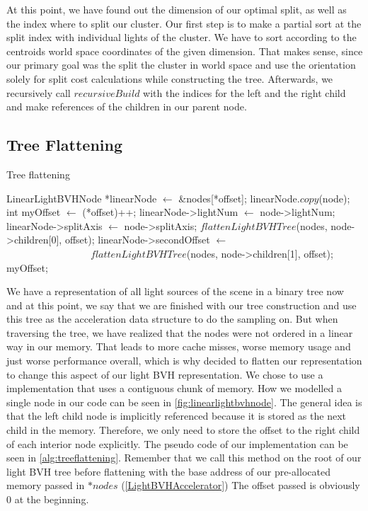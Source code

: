 At this point, we have found out the dimension of our optimal split, as well as the index where to split our cluster. Our first step is to make a partial sort at the split index with individual lights of the cluster. We have to sort according to the centroids world space coordinates of the given dimension. That makes sense, since our primary goal was the split the cluster in world space and use the orientation solely for split cost calculations while constructing the tree. Afterwards, we recursively call $recursiveBuild$ with the indices for the left and the right child and make references of the children in our parent node.

\subsection{Tree Flattening}
\label{subs:flat}

\begin{algorithm}
	\caption{Tree flattening}
	\label{alg:treeflattening}
	\begin{algorithmic}[1] %
		\State LinearLightBVHNode *linearNode $\gets$ \&nodes[*offset];
		\State linearNode.$copy$(node);
		\State int myOffset $\gets$ (*offset)++;
		\State linearNode->lightNum $\gets$ node->lightNum;
		\Else
		\State linearNode->splitAxis $\gets$ node->splitAxis;
		\State $flattenLightBVHTree$(nodes, node->children[0], offset);
		\State linearNode->secondOffset $\gets$ \\ \ \ \ \ \ \ \ \ \ \ \ \ \ \ \ \ \ $flattenLightBVHTree$(nodes, node->children[1], offset);
		\EndIf
		\State \Return myOffset;
		\EndProcedure
	\end{algorithmic}
\end{algorithm}

We have a representation of all light sources of the scene in a binary tree now and at this point, we say that we are finished with our tree construction and use this tree as the acceleration data structure to do the sampling on. But when traversing the tree, we have realized that the nodes were not ordered in a linear way in our memory. That leads to more cache misses, worse memory usage and just worse performance overall, which is why decided to flatten our representation to change this aspect of our light BVH representation. We chose to use a implementation that uses a contiguous chunk of memory. How we modelled a single node in our code can be seen in \ref{fig:linearlightbvhnode}. The general idea is that the left child node is implicitly referenced because it is stored as the next child in the memory. Therefore, we only need to store the offset to the right child of each interior node explicitly. The pseudo code of our implementation can be seen in \ref{alg:treeflattening}. Remember that we call this method on the root of our light BVH tree before flattening with the base address of our pre-allocated memory passed in $*nodes$ (\ref{LightBVHAccelerator}) The offset passed is obviously 0 at the beginning.

